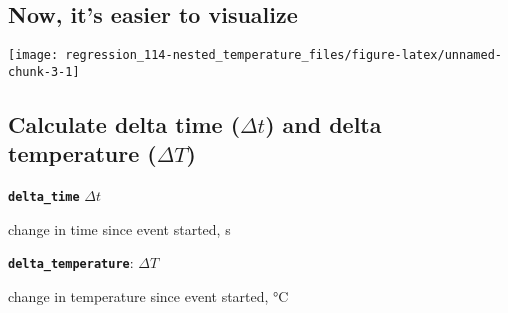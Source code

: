 \documentclass[]{book}
\newenvironment{Shaded}{\begin{snugshade}}{\end{snugshade}}
\newcommand{\DataTypeTok}[1]{\textcolor[rgb]{0.13,0.29,0.53}{#1}}
\newcommand{\DecValTok}[1]{\textcolor[rgb]{0.00,0.00,0.81}{#1}}
\newcommand{\KeywordTok}[1]{\textcolor[rgb]{0.13,0.29,0.53}{\textbf{#1}}}
\newcommand{\NormalTok}[1]{#1}
\newcommand{\OperatorTok}[1]{\textcolor[rgb]{0.81,0.36,0.00}{\textbf{#1}}}
\newcommand{\StringTok}[1]{\textcolor[rgb]{0.31,0.60,0.02}{#1}}
\begin{document}
\hypertarget{now-its-easier-to-visualize}{%
\subsection{Now, it's easier to visualize}\label{now-its-easier-to-visualize}}

\begin{Shaded}
\end{Shaded}

\begin{center}\texttt{[image: regression\_114-nested\_temperature\_files/figure-latex/unnamed-chunk-3-1]} \end{center}

\hypertarget{calculate-delta-time-delta-t-and-delta-temperature-delta-t}{%
\subsection{\texorpdfstring{Calculate delta time (\(\Delta t\)) and delta temperature (\(\Delta T\))}{Calculate delta time (\textbackslash{}Delta t) and delta temperature (\textbackslash{}Delta T)}}\label{calculate-delta-time-delta-t-and-delta-temperature-delta-t}}

\textbf{\texttt{delta\_time}} \(\Delta t\)

change in time since event started, s

\textbf{\texttt{delta\_temperature}}: \(\Delta T\)

change in temperature since event started, °C

\begin{Shaded}
\end{Shaded}
\end{document}
